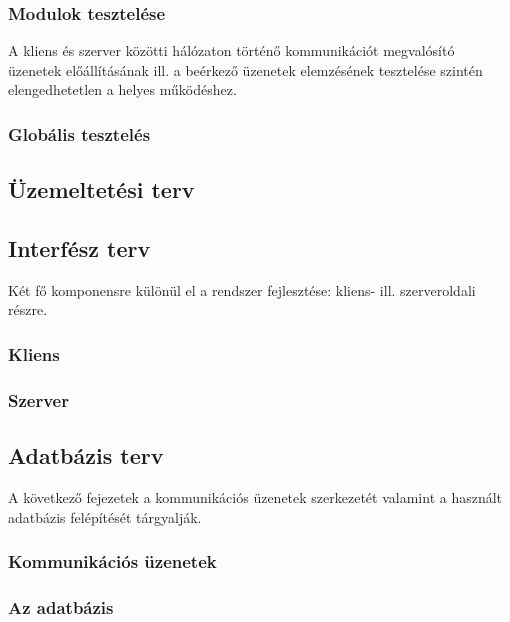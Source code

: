 \subsubsection{Modulok tesztelése}

A kliens és szerver közötti hálózaton történő kommunikációt megvalósító üzenetek előállításának ill. a beérkező üzenetek elemzésének tesztelése szintén elengedhetetlen a helyes működéshez.

\subsubsection{Globális tesztelés}

\subsection{Üzemeltetési terv}
\label{sec:uzemeltetesi_terv}

\subsection{Interfész terv}
\label{sec:interfesz_terv}

Két fő komponensre különül el a rendszer fejlesztése: kliens-
ill. szerveroldali részre.

\subsubsection{Kliens}
\label{sec:kliensinterfesz}

\subsubsection{Szerver}
\label{sec:szerverinterfesz}

\subsection{Adatbázis terv}

A következő fejezetek a kommunikációs üzenetek szerkezetét valamint a használt adatbázis felépítését tárgyalják.


\subsubsection{Kommunikációs üzenetek}
\label{sec:kommuzenetek}

\subsubsection{Az adatbázis}
\label{sec:adatb}


